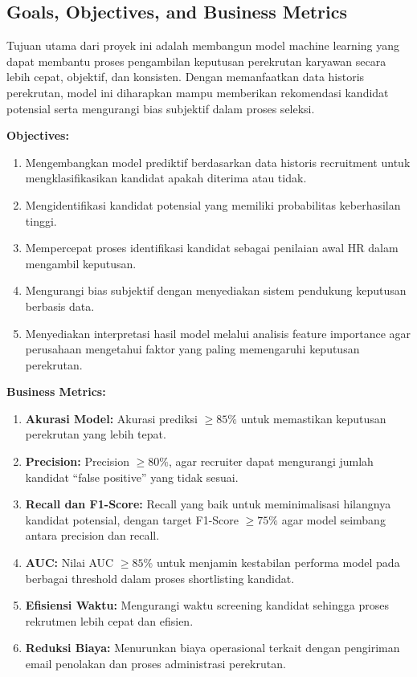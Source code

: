 \subsection{Goals, Objectives, and Business Metrics}

Tujuan utama dari proyek ini adalah membangun model machine learning yang dapat membantu proses pengambilan keputusan perekrutan karyawan secara lebih cepat, objektif, dan konsisten. Dengan memanfaatkan data historis perekrutan, model ini diharapkan mampu memberikan rekomendasi kandidat potensial serta mengurangi bias subjektif dalam proses seleksi.

\textbf{Objectives:}
\begin{enumerate}
    \item Mengembangkan model prediktif berdasarkan data historis recruitment untuk mengklasifikasikan kandidat apakah diterima atau tidak.
    \item Mengidentifikasi kandidat potensial yang memiliki probabilitas keberhasilan tinggi.
    \item Mempercepat proses identifikasi kandidat sebagai penilaian awal HR dalam mengambil keputusan.
    \item Mengurangi bias subjektif dengan menyediakan sistem pendukung keputusan berbasis data.
    \item Menyediakan interpretasi hasil model melalui analisis feature importance agar perusahaan mengetahui faktor yang paling memengaruhi keputusan perekrutan.
\end{enumerate}

\textbf{Business Metrics:}
\begin{enumerate}
    \item \textbf{Akurasi Model:} Akurasi prediksi $\geq 85\%$ untuk memastikan keputusan perekrutan yang lebih tepat.
    \item \textbf{Precision:} Precision $\geq 80\%$, agar recruiter dapat mengurangi jumlah kandidat ``false positive'' yang tidak sesuai.
    \item \textbf{Recall dan F1-Score:} Recall yang baik untuk meminimalisasi hilangnya kandidat potensial, dengan target F1-Score $\geq 75\%$ agar model seimbang antara precision dan recall.
    \item \textbf{AUC:} Nilai AUC $\geq 85\%$ untuk menjamin kestabilan performa model pada berbagai threshold dalam proses shortlisting kandidat.
    \item \textbf{Efisiensi Waktu:} Mengurangi waktu screening kandidat sehingga proses rekrutmen lebih cepat dan efisien.
    \item \textbf{Reduksi Biaya:} Menurunkan biaya operasional terkait dengan pengiriman email penolakan dan proses administrasi perekrutan.
\end{enumerate}

